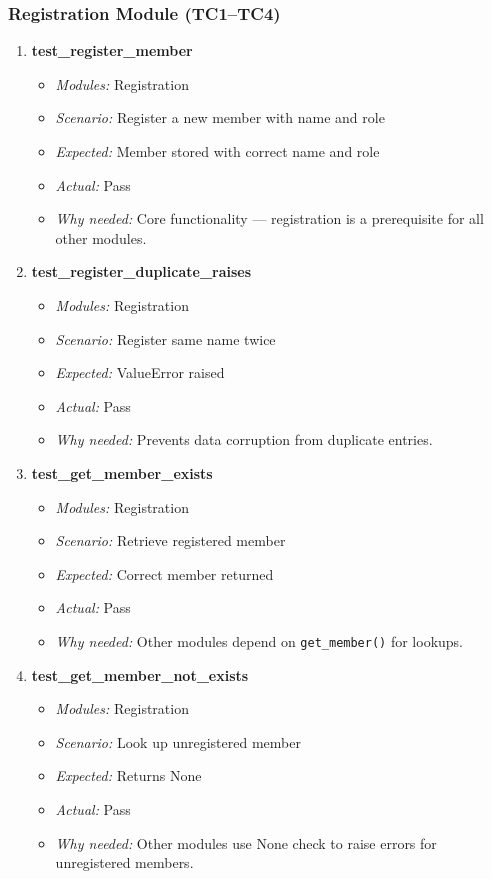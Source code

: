 \documentclass{article}
\begin{document}
\subsubsection*{Registration Module (TC1--TC4)}
\begin{enumerate}[label=\textbf{TC\arabic*.}]

\item \textbf{test\_register\_member}
\begin{itemize}[noitemsep]
  \item \textit{Modules:} Registration
  \item \textit{Scenario:} Register a new member with name and role
  \item \textit{Expected:} Member stored with correct name and role
  \item \textit{Actual:} Pass
  \item \textit{Why needed:} Core functionality — registration is a prerequisite for all other modules.
\end{itemize}

\item \textbf{test\_register\_duplicate\_raises}
\begin{itemize}[noitemsep]
  \item \textit{Modules:} Registration
  \item \textit{Scenario:} Register same name twice
  \item \textit{Expected:} ValueError raised
  \item \textit{Actual:} Pass
  \item \textit{Why needed:} Prevents data corruption from duplicate entries.
\end{itemize}

\item \textbf{test\_get\_member\_exists}
\begin{itemize}[noitemsep]
  \item \textit{Modules:} Registration
  \item \textit{Scenario:} Retrieve registered member
  \item \textit{Expected:} Correct member returned
  \item \textit{Actual:} Pass
  \item \textit{Why needed:} Other modules depend on \texttt{get\_member()} for lookups.
\end{itemize}

\item \textbf{test\_get\_member\_not\_exists}
\begin{itemize}[noitemsep]
  \item \textit{Modules:} Registration
  \item \textit{Scenario:} Look up unregistered member
  \item \textit{Expected:} Returns None
  \item \textit{Actual:} Pass
  \item \textit{Why needed:} Other modules use None check to raise errors for unregistered members.
\end{itemize}

\end{enumerate}
\end{document}
